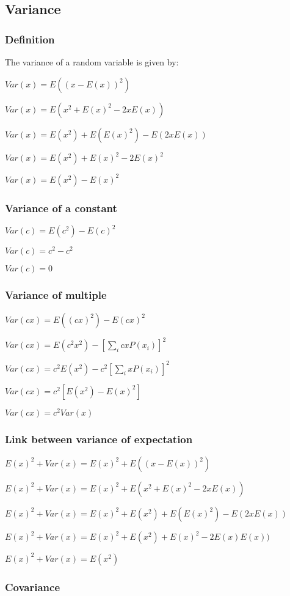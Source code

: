 
\subsection{Variance}

\subsubsection{Definition}

The variance of a random variable is given by:

$Var(x)=E((x-E(x))^2)$

$Var(x)=E(x^2+E(x)^2-2xE(x))$

$Var(x)=E(x^2)+E(E(x)^2)-E(2xE(x))$

$Var(x)=E(x^2)+E(x)^2-2E(x)^2$

$Var(x)=E(x^2)-E(x)^2$

\subsubsection{Variance of a constant}

$Var(c)=E(c^2)-E(c)^2$

$Var(c)= c^2-c^2$

$Var(c)=0$

\subsubsection{Variance of multiple}

$Var(cx)=E((cx)^2)-E(cx)^2$

$Var(cx)=E(c^2x^2)-[\sum_i cx P(x_i)]^2$

$Var(cx)=c^2E(x^2)-c^2[\sum_i x P(x_i)]^2$

$Var(cx)=c^2[E(x^2)- E(x)^2]$

$Var(cx)=c^2Var(x)$

\subsubsection{Link between variance of expectation}

$E(x)^2+Var(x)=E(x)^2+E((x-E(x))^2)$

$E(x)^2+Var(x)=E(x)^2+E(x^2+E(x)^2-2xE(x))$

$E(x)^2+Var(x)=E(x)^2+E(x^2)+E(E(x)^2)-E(2xE(x))$

$E(x)^2+Var(x)=E(x)^2+E(x^2)+E(x)^2-2E(x)E(x))$

$E(x)^2+Var(x)=E(x^2)$

\subsubsection{Covariance}

